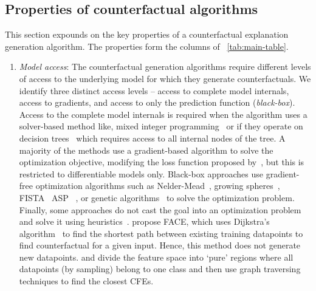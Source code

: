 \subsection{Properties of counterfactual algorithms}
This section expounds on the key properties of a counterfactual explanation generation algorithm. The properties form the columns of ~\cref{tab:main-table}. 
\begin{enumerate}[leftmargin=*]
    
    \item \emph{Model access}: The counterfactual generation algorithms require different levels of access to the underlying model for which they generate counterfactuals. We identify three distinct access levels -- access to complete model internals, access to gradients, and access to only the prediction function (\emph{black-box}). 
    Access to the complete model internals is required when the algorithm uses a solver-based method like, mixed integer programming~\citep{russell_efficient_2019,Ustun19:Actionable,karimi_model-agnostic_2020,karimi_algorithmic_2020,Kanamori2020:DACE} or if they operate on decision trees~\citep{Tolomei2017:Interpretable,fernandez-random:2020,lucic-actionable:2020, oblique-tree-cfe, scaling_Nearest_CFE} which requires access to all internal nodes of the tree.
    A majority of the methods use a gradient-based algorithm to solve the optimization objective, modifying the loss function proposed by~\citet{wachter_counterfactual_2017}, but this is restricted to differentiable models only. 
    Black-box approaches use gradient-free optimization algorithms such as Nelder-Mead~\citep{grath_interpretable_2018}, growing spheres~\citep{medina_comparison-based_2018}, FISTA~\citep{dhurandhar_model_2019,van_looveren_interpretable_2020} ASP ~\citep{declarative-CFE}, or genetic algorithms~\citep{inverse-classification2,sharma_certifai_2019,dandl_multi-objective_2020} to solve the optimization problem. 
    Finally, some approaches do not cast the goal into an optimization problem and solve it using heuristics~\citep{guidotti_local_2018,rathi-generating:2019,white_measurable_2019,keane2020good}.
    \citet{poyiadzi_face_2020} propose FACE, which uses Dijkstra's algorithm~\citep{dijkstra1959} to find the shortest path between existing training datapoints to find counterfactual for a given input. Hence, this method does not generate new datapoints. \citet{Fraunhofer-pure-region-sampling} and \citet{Pierre-tree-ensemble-pure-region} divide the feature space into `pure' regions where all datapoints (by sampling) belong to one class and then use graph traversing techniques to find the closest CFEs.  
    

\end{enumerate}
